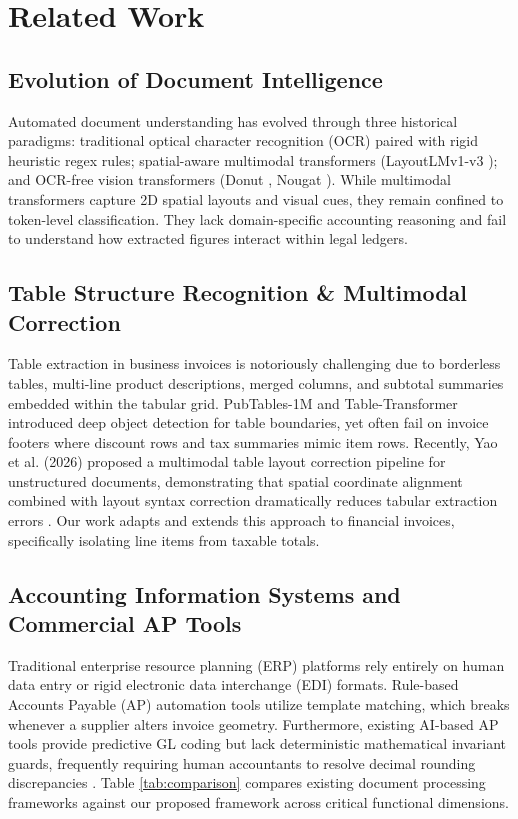 \documentclass[conference]{IEEEtran}
\begin{document}
\section{Related Work}
\subsection{Evolution of Document Intelligence}
Automated document understanding has evolved through three historical paradigms: traditional optical character recognition (OCR) paired with rigid heuristic regex rules; spatial-aware multimodal transformers (LayoutLMv1-v3 \cite{xu2020layoutlm, xu2021layoutlmv2, huang2022layoutlmv3}); and OCR-free vision transformers (Donut \cite{kim2022donut}, Nougat \cite{blecher2023nougat}). While multimodal transformers capture 2D spatial layouts and visual cues, they remain confined to token-level classification. They lack domain-specific accounting reasoning and fail to understand how extracted figures interact within legal ledgers.

\subsection{Table Structure Recognition \& Multimodal Correction}
Table extraction in business invoices is notoriously challenging due to borderless tables, multi-line product descriptions, merged columns, and subtotal summaries embedded within the tabular grid. PubTables-1M \cite{smock2022pubtables} and Table-Transformer introduced deep object detection for table boundaries, yet often fail on invoice footers where discount rows and tax summaries mimic item rows. Recently, Yao et al. (2026) proposed a multimodal table layout correction pipeline for unstructured documents, demonstrating that spatial coordinate alignment combined with layout syntax correction dramatically reduces tabular extraction errors \cite{yao2026multimodal}. Our work adapts and extends this approach to financial invoices, specifically isolating line items from taxable totals.

\subsection{Accounting Information Systems and Commercial AP Tools}
Traditional enterprise resource planning (ERP) platforms rely entirely on human data entry or rigid electronic data interchange (EDI) formats. Rule-based Accounts Payable (AP) automation tools utilize template matching, which breaks whenever a supplier alters invoice geometry. Furthermore, existing AI-based AP tools provide predictive GL coding but lack deterministic mathematical invariant guards, frequently requiring human accountants to resolve decimal rounding discrepancies \cite{vasoya2022ai}. Table \ref{tab:comparison} compares existing document processing frameworks against our proposed framework across critical functional dimensions.
\end{document}
